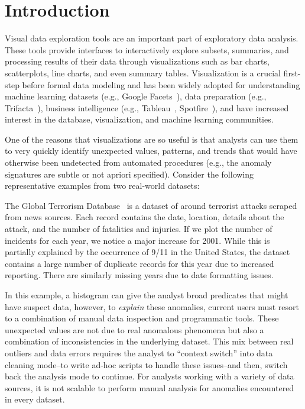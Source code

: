 \section{Introduction}\label{intro}\sloppy
Visual data exploration tools are an important part of exploratory 
data analysis. These tools provide interfaces to interactively explore subsets, summaries, and processing results of their data through visualizations such as bar charts, scatterplots, line charts, and even summary tables.  Visualization is a crucial first-step before formal data modeling and has been widely adopted for understanding machine learning datasets (e.g., Google Facets~\cite{googlefacets}), data preparation (e.g., Trifacta~\cite{trifacta}), business intelligence (e.g., Tableau~\cite{stolte2002polaris}, Spotfire~\cite{shneiderman1999dynamic}), and have increased interest in the database, visualization, and machine learning communities. 

One of the reasons that visualizations are so useful is that analysts can use them to very quickly identify unexpected values, patterns, and trends that would have otherwise been undetected from automated procedures (e.g., the anomaly signatures are subtle or not apriori specified).  Consider the following representative examples from two real-world datasets: 

\begin{example}[Terrorism]
The Global Terrorism Database~\cite{data-terrorism} is a dataset of around terrorist attacks scraped from news sources.  Each record contains the date, location, details about the attack, and the number of fatalities and injuries.  If we plot the number of incidents for each year, we notice a major increase for 2001. While this is partially explained by the occurrence of 9/11 in the United States, the dataset contains a large number of duplicate records for this year due to increased reporting. There are similarly missing years due to date formatting issues.
\label{e:terrorism}
\end{example}

In this example, a histogram can give the analyst broad predicates that might have suspect data, however, to {\it explain} these anomalies, current users must resort to a combination of manual data inspection and programmatic tools. These unexpected values are not due to real anomalous phenomena but also a combination of inconsistencies in the underlying dataset.  This mix between real outliers and data errors requires the analyst to ``context switch'' into data cleaning mode--to write ad-hoc scripts to handle these issues--and then, switch back the analysis mode to continue. For analysts working with a variety of data sources, it is not scalable to perform manual analysis for anomalies encountered in every dataset.

